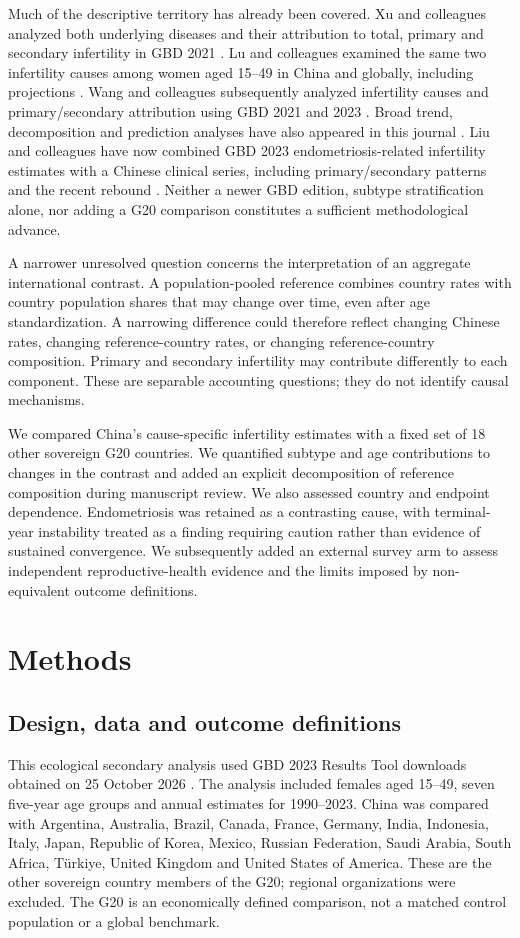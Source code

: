 \documentclass[11pt,a4paper]{article}
\begin{document}
Much of the descriptive territory has already been covered. Xu and colleagues analyzed both underlying diseases and their attribution to total, primary and secondary infertility in GBD 2021 \cite{xu}. Lu and colleagues examined the same two infertility causes among women aged 15--49 in China and globally, including projections \cite{lu}. Wang and colleagues subsequently analyzed infertility causes and primary/secondary attribution using GBD 2021 and 2023 \cite{wang}. Broad trend, decomposition and prediction analyses have also appeared in this journal \cite{feng}. Liu and colleagues have now combined GBD 2023 endometriosis-related infertility estimates with a Chinese clinical series, including primary/secondary patterns and the recent rebound \cite{liu2026}. Neither a newer GBD edition, subtype stratification alone, nor adding a G20 comparison constitutes a sufficient methodological advance.

A narrower unresolved question concerns the interpretation of an aggregate international contrast. A population-pooled reference combines country rates with country population shares that may change over time, even after age standardization. A narrowing difference could therefore reflect changing Chinese rates, changing reference-country rates, or changing reference-country composition. Primary and secondary infertility may contribute differently to each component. These are separable accounting questions; they do not identify causal mechanisms.

We compared China's cause-specific infertility estimates with a fixed set of 18 other sovereign G20 countries. We quantified subtype and age contributions to changes in the contrast and added an explicit decomposition of reference composition during manuscript review. We also assessed country and endpoint dependence. Endometriosis was retained as a contrasting cause, with terminal-year instability treated as a finding requiring caution rather than evidence of sustained convergence. We subsequently added an external survey arm to assess independent reproductive-health evidence and the limits imposed by non-equivalent outcome definitions.

\section{Methods}
\subsection{Design, data and outcome definitions}
This ecological secondary analysis used GBD 2023 Results Tool downloads obtained on 25 October 2026 \cite{results}. The analysis included females aged 15--49, seven five-year age groups and annual estimates for 1990--2023. China was compared with Argentina, Australia, Brazil, Canada, France, Germany, India, Indonesia, Italy, Japan, Republic of Korea, Mexico, Russian Federation, Saudi Arabia, South Africa, T\"urkiye, United Kingdom and United States of America. These are the other sovereign country members of the G20; regional organizations were excluded. The G20 is an economically defined comparison, not a matched control population or a global benchmark.
\end{document}
